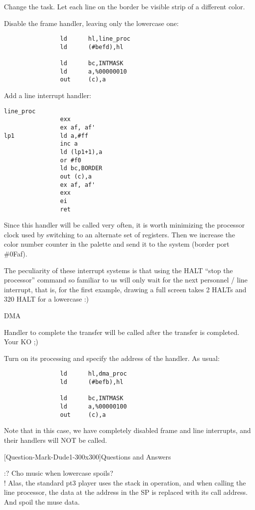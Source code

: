 Change the task. Let each line on the border be visible strip of a
different color.

Disable the frame handler, leaving only the lowercase one:
\begin{verbatim}
                ld      hl,line_proc
                ld      (#befd),hl

                ld      bc,INTMASK
                ld      a,%00000010
                out     (c),a
\end{verbatim}
Add a line interrupt handler:
\begin{verbatim}
line_proc
                exx
                ex af, af'
lp1             ld a,#ff
                inc a
                ld (lp1+1),a
                or #f0
                ld bc,BORDER
                out (c),a
                ex af, af'
                exx
                ei
                ret
\end{verbatim}
Since this handler will be called very often, it is worth minimizing
the processor clock used by switching to an alternate set of
registers. Then we increase the color number counter in the palette
and send it to the system (border port \#0Faf).

The peculiarity of these interrupt systems is that using the HALT
“stop the processor” command so familiar to us will only wait for the
next personnel / line interrupt, that is, for the first example,
drawing a full screen takes 2 HALTs and 320 HALT for a lowercase :)

DMA

Handler to complete the transfer will be called after the transfer is
completed. Your KO ;)

Turn on its processing and specify the address of the handler. As
usual:
\begin{verbatim}
                ld      hl,dma_proc
                ld      (#befb),hl

                ld      bc,INTMASK
                ld      a,%00000100
                out     (c),a
\end{verbatim}
Note that in this case, we have completely disabled frame and line
interrupts, and their handlers will NOT be called.

[Question-Mark-Dude1-300x300]Questions and Answers

:? Cho music when lowercase spoils?\\
! Alas, the standard pt3 player uses the stack in operation, and when
calling the line processor, the data at the address in the SP is
replaced with its call address. And spoil the muse data.

